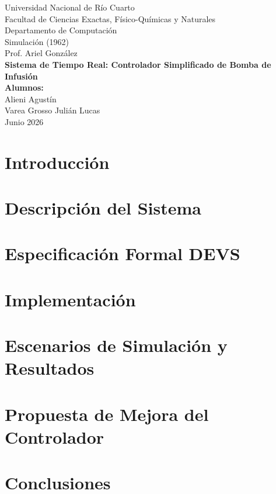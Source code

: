 \documentclass[11pt,a4paper]{report}
\begin{document}
\begin{titlepage}
    \centering
    \vspace*{1cm}
    {\Large Universidad Nacional de Río Cuarto} \\[0.3cm]
    {\Large Facultad de Ciencias Exactas, Físico-Químicas y Naturales} \\[0.3cm]
    {\Large Departamento de Computación} \\[0.3cm]
    {\Large Simulación (1962)} \\[0.3cm]
    {\Large Prof. Ariel González} \\[3cm]
    
    {\huge \bfseries Sistema de Tiempo Real: Controlador Simplificado de Bomba de Infusión} \\[4cm]
    
    {\large \bfseries Alumnos:} \\[0.3cm]
    {\large Alieni Agustín} \\
    {\large Varea Grosso Julián Lucas} \\[2cm]
    
    \vfill
    {\large Junio 2026} \\
\end{titlepage}

\tableofcontents
\newpage

\chapter{Introducción}


\chapter{Descripción del Sistema}


\chapter{Especificación Formal DEVS}


\chapter{Implementación}


\chapter{Escenarios de Simulación y Resultados}


\chapter{Propuesta de Mejora del Controlador}


\chapter{Conclusiones}

\end{document}
